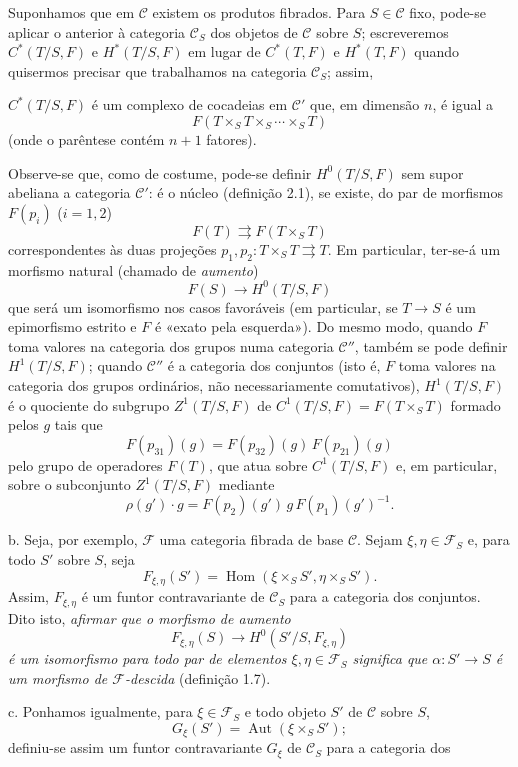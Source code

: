 \documentclass[11pt,twoside,openany]{book}
\numberwithin{equation}{section}
\newcommand{\src}[1]{%
  \phantomsection\hypertarget{src:#1}{}%
  \marginpar{\raggedleft\footnotesize\sffamily #1}%
}
\theoremstyle{plain}
\theoremstyle{definition}
\theoremstyle{remark}
\newcommand{\FgaUnitKey}{frontmatter}
\renewcommand{\src}[1]{%
  \phantomsection\hypertarget{src:\FgaUnitKey:#1}{}%
  \marginpar{\raggedleft\footnotesize\sffamily #1}%
}
\begin{document}
Suponhamos que em $\mathcal C$ existem os produtos fibrados. Para
$S\in\mathcal C$ fixo, pode-se aplicar o anterior à categoria
$\mathcal C_S$ dos objetos de $\mathcal C$ sobre $S$; escreveremos
$C^*(T/S,F)$ e $H^*(T/S,F)$ em lugar de $C^*(T,F)$ e $H^*(T,F)$ quando
quisermos precisar que trabalhamos na categoria $\mathcal C_S$; assim,

\src{311}
$C^*(T/S,F)$ é um complexo de cocadeias em $\mathcal C'$ que, em dimensão
$n$, é igual a
\[
  F(T\times_ST\times_S\cdots\times_ST)
\]
(onde o parêntese contém $n+1$ fatores).

Observe-se que, como de costume, pode-se definir $H^0(T/S,F)$ sem supor
abeliana a categoria $\mathcal C'$: é o núcleo (definição 2.1), se existe,
do par de morfismos $F(p_i)$ ($i=1,2$)
\[
  F(T)\rightrightarrows F(T\times_ST)
\]
correspondentes às duas projeções
$p_1,p_2:T\times_ST\rightrightarrows T$. Em particular, ter-se-á um morfismo
natural (chamado de \emph{aumento})
\[
  F(S)\longrightarrow H^0(T/S,F)
\]
que será um isomorfismo nos casos favoráveis (em particular, se
$T\longrightarrow S$ é um epimorfismo estrito e $F$ é «exato pela
esquerda»). Do mesmo modo, quando $F$ toma valores na categoria dos
grupos numa categoria $\mathcal C''$, também se pode definir $H^1(T/S,F)$;
quando $\mathcal C''$ é a categoria dos conjuntos (isto é, $F$ toma
valores na categoria dos grupos ordinários, não necessariamente
comutativos), $H^1(T/S,F)$ é o quociente do subgrupo $Z^1(T/S,F)$ de
$C^1(T/S,F)=F(T\times_ST)$ formado pelos $g$ tais que
\[
  F(p_{31})(g)=F(p_{32})(g)\,F(p_{21})(g)
\]
pelo grupo de operadores $F(T)$, que atua sobre $C^1(T/S,F)$ e, em
particular, sobre o subconjunto $Z^1(T/S,F)$ mediante
\[
  \rho(g')\cdot g=F(p_2)(g')\,g\,F(p_1)(g')^{-1}.
\]

\medskip\noindent
b. Seja, por exemplo, $\mathcal F$ uma categoria fibrada de base $\mathcal C$.
Sejam $\xi,\eta\in\mathcal F_S$ e, para todo $S'$ sobre $S$, seja
\[
  F_{\xi,\eta}(S')=
  \operatorname{Hom}(\xi\times_SS',\eta\times_SS').
\]
Assim, $F_{\xi,\eta}$ é um funtor contravariante de $\mathcal C_S$ para a
categoria dos conjuntos. Dito isto, \emph{afirmar que o morfismo de
aumento}
\[
  F_{\xi,\eta}(S)\longrightarrow H^0(S'/S,F_{\xi,\eta})
\]
\emph{é um isomorfismo para todo par de elementos
$\xi,\eta\in\mathcal F_S$ significa que
$\alpha:S'\longrightarrow S$ é um morfismo de $\mathcal F$-descida}
(definição 1.7).

\medskip\noindent
c. Ponhamos igualmente, para $\xi\in\mathcal F_S$ e todo objeto $S'$ de
$\mathcal C$ sobre $S$,
\[
  G_\xi(S')=\operatorname{Aut}(\xi\times_SS') ;
\]
definiu-se assim um funtor contravariante $G_\xi$ de $\mathcal C_S$ para a
categoria dos
\end{document}
